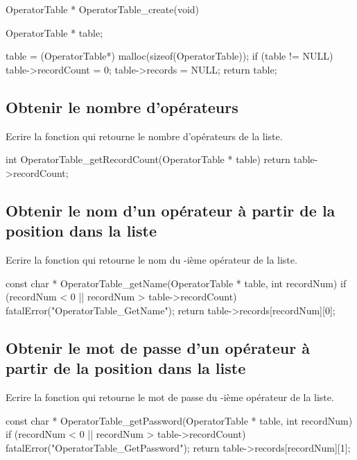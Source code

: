 \begin{csourcecorrection}
OperatorTable * OperatorTable_create(void) {
    OperatorTable * table;

    table = (OperatorTable*) malloc(sizeof(OperatorTable));
    if (table != NULL) {
        table->recordCount = 0;
        table->records = NULL;
    }
    return table;
}
\end{csourcecorrection}

\subsection{Obtenir le nombre d'opérateurs}

Ecrire la fonction  qui retourne le nombre d'opérateurs de la liste.

\begin{csourcecorrection}
int OperatorTable_getRecordCount(OperatorTable * table) {
   return table->recordCount;
}
\end{csourcecorrection}

\subsection{Obtenir le nom d'un opérateur à partir de la position dans la liste}

Ecrire la fonction  qui retourne le nom du -ième opérateur de la liste.

\begin{csourcecorrection}
const char * OperatorTable_getName(OperatorTable * table, int recordNum) {
    if (recordNum < 0 || recordNum > table->recordCount)
        fatalError("OperatorTable_GetName");
    return table->records[recordNum][0];
}
\end{csourcecorrection}

\subsection{Obtenir le mot de passe d'un opérateur à partir de la position dans la liste}

Ecrire la fonction  qui retourne le mot de passe du -ième opérateur de la liste.

\begin{csourcecorrection}
const char * OperatorTable_getPassword(OperatorTable * table, int recordNum) {
    if (recordNum < 0 || recordNum > table->recordCount)
        fatalError("OperatorTable_GetPassword");
    return table->records[recordNum][1];
}
\end{csourcecorrection}


